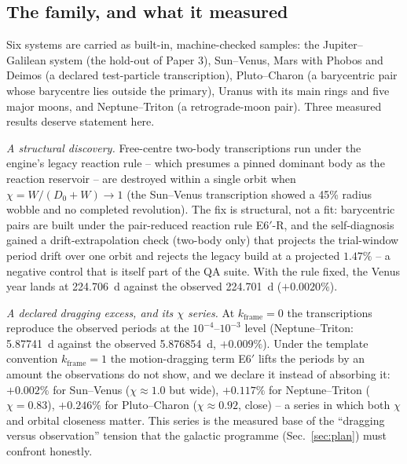 \documentclass[aps,reprint,amsmath,amssymb,nofootinbib,superscriptaddress,floatfix]{revtex4-2}
\begin{document}
\subsection{The family, and what it measured}

Six systems are carried as built-in, machine-checked samples: the
Jupiter--Galilean system (the hold-out of Paper 3), Sun--Venus, Mars
with Phobos and Deimos (a declared test-particle transcription),
Pluto--Charon (a barycentric pair whose barycentre lies outside the
primary), Uranus with its main rings and five major moons, and
Neptune--Triton (a retrograde-moon pair). Three measured results
deserve statement here.

\emph{A structural discovery.} Free-centre two-body transcriptions run
under the engine's legacy reaction rule -- which presumes a pinned
dominant body as the reaction reservoir -- are destroyed within a
single orbit when $\chi = W/(D_0+W) \rightarrow 1$ (the Sun--Venus
transcription showed a 45\% radius wobble and no completed revolution).
The fix is structural, not a fit: barycentric pairs are built under the
pair-reduced reaction rule E6$'$-R, and the self-diagnosis gained a
drift-extrapolation check (two-body only) that projects the trial-window
period drift over one orbit and rejects the legacy build at a projected
$1.47\%$ -- a negative control that is itself part of the QA suite.
With the rule fixed, the Venus year lands at 224.706~d against the
observed 224.701~d ($+0.0020\%$).

\emph{A declared dragging excess, and its $\chi$ series.} At
$k_{\mathrm{frame}}=0$ the transcriptions reproduce the observed
periods at the $10^{-4}$--$10^{-3}$ level (Neptune--Triton: 5.87741~d
against the observed 5.876854~d, $+0.009\%$). Under the template
convention $k_{\mathrm{frame}}=1$ the motion-dragging term E6$'$ lifts
the periods by an amount the observations do not show, and we declare
it instead of absorbing it: $+0.002\%$ for Sun--Venus ($\chi\approx1.0$
but wide), $+0.117\%$ for Neptune--Triton ($\chi=0.83$),
$+0.246\%$ for Pluto--Charon ($\chi\approx0.92$, close) -- a series in
which both $\chi$ and orbital closeness matter. This series is the
measured base of the ``dragging versus observation'' tension that the
galactic programme (Sec.~\ref{sec:plan}) must confront honestly.
\end{document}
